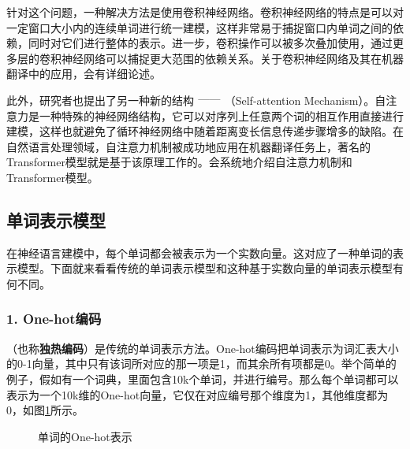 \parinterval  针对这个问题，一种解决方法是使用卷积神经网络。卷积神经网络的特点是可以对一定窗口大小内的连续单词进行统一建模，这样非常易于捕捉窗口内单词之间的依赖，同时对它们进行整体的表示。进一步，卷积操作可以被多次叠加使用，通过更多层的卷积神经网络可以捕捉更大范围的依赖关系。关于卷积神经网络及其在机器翻译中的应用，{\chaptereleven}会有详细论述。

\parinterval  此外，研究者也提出了另一种新的结构$\ \dash \ ${\small{}}（Self-attention Mechanism）。自注意力是一种特殊的神经网络结构，它可以对序列上任意两个词的相互作用直接进行建模，这样也就避免了循环神经网络中随着距离变长信息传递步骤增多的缺陷。在自然语言处理领域，自注意力机制被成功地应用在机器翻译任务上，著名的Transformer模型就是基于该原理工作的。{\chaptertwelve}会系统地介绍自注意力机制和Transformer模型。


\subsection{单词表示模型}

\parinterval  在神经语言建模中，每个单词都会被表示为一个实数向量。这对应了一种单词的表示模型。下面就来看看传统的单词表示模型和这种基于实数向量的单词表示模型有何不同。


\subsubsection{1. One-hot编码}

（也称{\small\sffamily\bfseries{独热编码}}）是传统的单词表示方法。One-hot编码把单词表示为词汇表大小的0-1向量，其中只有该词所对应的那一项是1，而其余所有项都是0。举个简单的例子，假如有一个词典，里面包含10k个单词，并进行编号。那么每个单词都可以表示为一个10k维的One-hot向量，它仅在对应编号那个维度为1，其他维度都为0，如图\ref{fig:9-64}所示。

\begin{figure}[htp]
\centering

\caption{单词的One-hot表示 }
\label{fig:9-64}
\end{figure}

